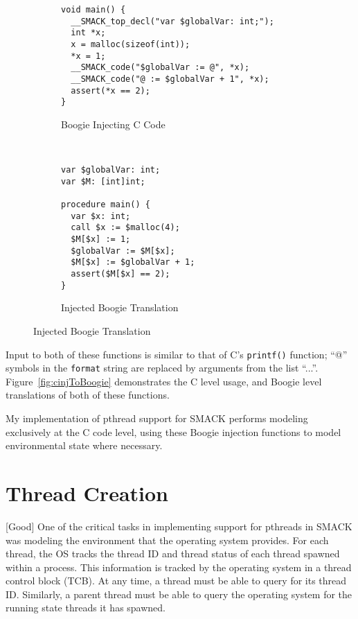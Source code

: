 \begin{figure}[h]
\centering
\caption{Injecting Boogie Code from C}\label{fig:cinjToBoogie}
\begin{subfigure}[b]{1\textwidth}
\centering
\caption{Boogie Injecting C Code}\label{fig:cinjToBoogie_a}
\begin{lstlisting}
void main() {
  __SMACK_top_decl("var $globalVar: int;");
  int *x;
  x = malloc(sizeof(int));
  *x = 1;
  __SMACK_code("$globalVar := @", *x);
  __SMACK_code("@ := $globalVar + 1", *x);
  assert(*x == 2);
}
\end{lstlisting}
\end{subfigure}
~
\begin{subfigure}[b]{1\textwidth}
\centering
\caption{Injected Boogie Translation}\label{fig:cinjToBoogie_b}
\begin{lstlisting}[language=boogie]
var $globalVar: int;
var $M: [int]int;

procedure main() {
  var $x: int;
  call $x := $malloc(4);
  $M[$x] := 1;
  $globalVar := $M[$x];
  $M[$x] := $globalVar + 1;
  assert($M[$x] == 2);
}
\end{lstlisting}
\end{subfigure}
\end{figure}

Input to both of these functions is similar to that of C's
\lstinline|printf()| function; ``@'' symbols in the
\lstinline|format| string are replaced by arguments from the list
``...''.  Figure~\ref{fig:cinjToBoogie} demonstrates the C level usage,
and Boogie level translations of both of these functions.

My implementation of pthread support for SMACK performs modeling
exclusively at the C code level, using these Boogie injection
functions to model environmental state where necessary.

\section{Thread Creation}
[Good]
One of the critical tasks in implementing support for pthreads in
SMACK was modeling the environment that the operating system provides.
For each thread, the OS tracks the thread ID and thread status of
each thread spawned within a process.  This information is tracked by
the operating system in a thread control block (TCB).  At any time, a
thread must be able to query for its thread ID.  Similarly, a 
parent thread must be able to query the operating system for the
running state threads it has spawned.

